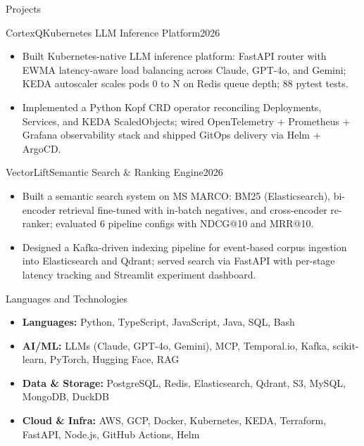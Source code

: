 \documentclass[]{mcdowellcv}
\begin{document}
\begin{cvsection}{Projects}
  \begin{cvsubsection}{CortexQ}{Kubernetes LLM Inference Platform}{2026}
    \begin{itemize}
      \item Built Kubernetes-native LLM inference platform: FastAPI router with EWMA latency-aware load balancing across Claude, GPT-4o, and Gemini; KEDA autoscaler scales pods 0 to N on Redis queue depth; 88 pytest tests.
      \item Implemented a Python Kopf CRD operator reconciling Deployments, Services, and KEDA ScaledObjects; wired OpenTelemetry + Prometheus + Grafana observability stack and shipped GitOps delivery via Helm + ArgoCD.
    \end{itemize}
    \vspace{-1.5pt}
  \end{cvsubsection}

  \begin{cvsubsection}{VectorLift}{Semantic Search \& Ranking Engine}{2026}
    \begin{itemize}
      \item Built a semantic search system on MS MARCO: BM25 (Elasticsearch), bi-encoder retrieval fine-tuned with in-batch negatives, and cross-encoder re-ranker; evaluated 6 pipeline configs with NDCG@10 and MRR@10.
      \item Designed a Kafka-driven indexing pipeline for event-based corpus ingestion into Elasticsearch and Qdrant; served search via FastAPI with per-stage latency tracking and Streamlit experiment dashboard.
    \end{itemize}
    \vspace{-1.5pt}
  \end{cvsubsection}
\end{cvsection}

\begin{cvsection}{Languages and Technologies}
  \begin{cvsubsection}{}{}{}
    \begin{itemize}
      \item \textbf{Languages:} Python, TypeScript, JavaScript, Java, SQL, Bash
      \item \textbf{AI/ML:} LLMs (Claude, GPT-4o, Gemini), MCP, Temporal.io, Kafka, scikit-learn, PyTorch, Hugging Face, RAG
      \item \textbf{Data \& Storage:} PostgreSQL, Redis, Elasticsearch, Qdrant, S3, MySQL, MongoDB, DuckDB
      \item \textbf{Cloud \& Infra:} AWS, GCP, Docker, Kubernetes, KEDA, Terraform, FastAPI, Node.js, GitHub Actions, Helm
    \end{itemize}
  \end{cvsubsection}
\end{cvsection}
\end{document}
